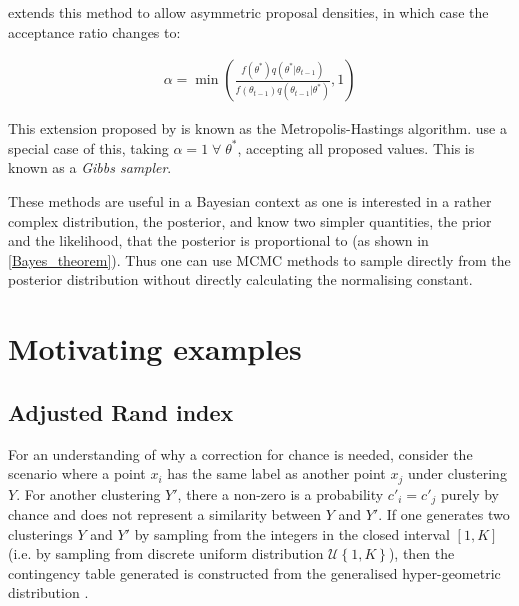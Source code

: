 \documentclass[12pt]{article} %
\begin{document}
\citet{HastingsMonteCarloSampling} extends this method to allow asymmetric proposal densities, in which case the acceptance ratio changes to:

\begin{align} \label{metropolis_hastings_alpha}
\alpha = \min\left(\frac{f(\theta^*) q(\theta^*|\theta_{t-1})}{f(\theta_{t-1})q(\theta_{t-1}|\theta^*)}, 1\right)
\end{align}

This extension proposed by \citet{HastingsMonteCarloSampling} is known as the Metropolis-Hastings algorithm. \citet{GemanStochasticRelaxationGibbs1984} use a special case of this, taking $\alpha = 1 \; \forall \; \theta^*$, accepting all proposed values. This is known as a \emph{Gibbs sampler}.

These methods are useful in a Bayesian context as one is interested in a rather complex distribution, the posterior, and know two simpler quantities, the prior and the likelihood, that the posterior is proportional to (as shown in \eqref{Bayes_theorem}). Thus one can use MCMC methods to sample directly from the posterior distribution without directly calculating the normalising constant.

\section{Motivating examples}


\subsection{Adjusted Rand index} \label{sec:motivating_example_adjusted_rand_index}
For an understanding of why a correction for chance is needed, consider the scenario where a point $x_i$ has the same label as another point $x_j$ under clustering $Y$. For another clustering $Y'$, there a non-zero is a probability $c'_i=c'_j$ purely by chance and does not represent a similarity between $Y$ and $Y'$. If one generates two clusterings $Y$ and $Y'$ by sampling from the integers in the closed interval $[1,K]$ (i.e. by sampling from discrete uniform distribution $\mathcal{U}\left\{1,K\right\}$), then the contingency table generated is constructed from the generalised hyper-geometric distribution \citep{HubertComparingpartitions1985}. 
\end{document}
